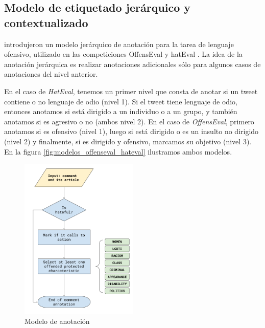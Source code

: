 \subsection{Modelo de etiquetado jerárquico y contextualizado}

\citet{zampieri2019predicting} introdujeron un modelo jerárquico de anotación para la tarea de lenguaje ofensivo, utilizado en las competiciones OffensEval \cite{zampieri2019semeval2019} y hatEval \cite{hateval2019semeval}. La idea de la anotación jerárquica es realizar anotaciones adicionales sólo para algunos casos de anotaciones del nivel anterior.

En el caso de \emph{HatEval}, tenemos un primer nivel que consta de anotar si un tweet contiene o no lenguaje de odio (nivel 1). Si el tweet tiene lenguaje de odio, entonces anotamos si está dirigido a un individuo o a un grupo, y también anotamos si es agresivo o no (ambos nivel 2). En el caso de \emph{OffensEval}, primero anotamos si es ofensivo (nivel 1), luego si está dirigido o es un insulto no dirigido (nivel 2) y finalmente, si es dirigido y ofensivo, marcamos su objetivo (nivel 3). En la figura \ref{fig:modelos_offenseval_hateval} ilustramos ambos modelos.


%
%
%



\begin{figure}
    \centering
    \includegraphics[width=0.5\textwidth]{img/Annotation Model.png}
    \caption{Modelo de anotación}
    \label{fig:annotation_model}
\end{figure}


